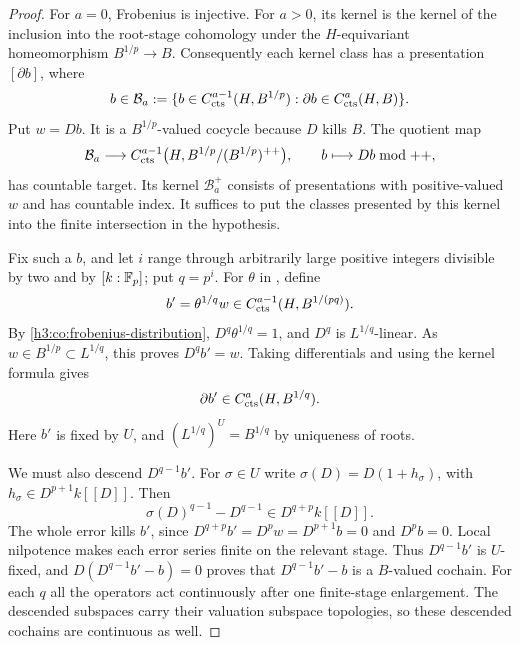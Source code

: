 \begin{proof}
For $a=0$, Frobenius is injective.  For $a>0$, its kernel is the kernel
of the inclusion into the root-stage cohomology under the
$H$-equivariant homeomorphism $B^{1/p}\to B$.  Consequently each kernel
class has a presentation $[\partial b]$, where
\[
 b\in\mathcal B_a
 :=\{b\in C^{a-1}_{\mathrm{cts}}(H,B^{1/p}):
               \partial b\in C^a_{\mathrm{cts}}(H,B)\}.
\]
Put $w=Db$.  It is a $B^{1/p}$-valued cocycle because $D$ kills $B$.
The quotient map
\[
 \mathcal B_a\longrightarrow
 C^{a-1}_{\mathrm{cts}}\bigl(H,B^{1/p}/(B^{1/p})^{++}\bigr),\qquad
 b\longmapsto Db\bmod ++,
\]
has countable target.  Its kernel $\mathcal B_a^+$ consists of
presentations with positive-valued $w$ and has countable index.
It suffices to put the classes presented by this kernel into the finite
intersection in the hypothesis.

Fix such a $b$, and let $i$ range through arbitrarily large positive
integers divisible by two and by $[k:\mathbb F_p]$; put $q=p^i$.
For $\theta$ in , define
\[
 b'=\theta^{1/q}w\in C^{a-1}_{\mathrm{cts}}(H,B^{1/(pq)}).
\]
By \eqref{h3:co:frobenius-distribution},
$D^q\theta^{1/q}=1$, and $D^q$ is $L^{1/q}$-linear.
As $w\in B^{1/p}\subset L^{1/q}$, this proves $D^qb'=w$.
Taking differentials and using the kernel formula gives
\begin{equation}\label{h3:co:primitive-root-level}
 \partial b'\in C^a_{\mathrm{cts}}(H,B^{1/q}).
\end{equation}
Here $b'$ is fixed by $U$, and
$(L^{1/q})^U=B^{1/q}$ by uniqueness of roots.

We must also descend $D^{q-1}b'$.  For $\sigma\in U$ write
$\sigma(D)=D(1+h_\sigma)$, with
$h_\sigma\in D^{p+1}k[[D]]$.  Then
\[
 \sigma(D)^{q-1}-D^{q-1}
 \in D^{q+p}k[[D]].
\]
The whole error kills $b'$, since
$D^{q+p}b'=D^pw=D^{p+1}b=0$ and $D^pb=0$.
Local nilpotence makes each error series finite on the relevant stage.
Thus $D^{q-1}b'$ is $U$-fixed, and
$D(D^{q-1}b'-b)=0$ proves that $D^{q-1}b'-b$ is a $B$-valued
cochain.  For each $q$ all the operators act continuously after one
finite-stage enlargement.  The descended subspaces carry their
valuation subspace topologies, so these descended cochains are
continuous as well.


\end{proof}
